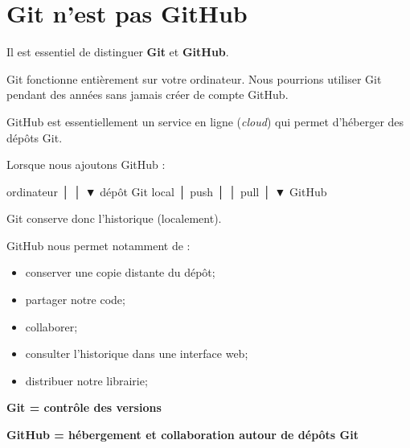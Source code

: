 \documentclass[
  letterpaper,
  DIV=11,
  numbers=noendperiod]{scrreprt}
\newenvironment{Shaded}{\begin{snugshade}}{\end{snugshade}}
\newcommand{\NormalTok}[1]{\textcolor[rgb]{0.00,0.23,0.31}{#1}}
\providecommand{\tightlist}{%
  \setlength{\itemsep}{0pt}\setlength{\parskip}{0pt}}\usepackage{longtable,booktabs,array}
\begin{document}
\section{Git n'est pas GitHub}\label{git-nest-pas-github-1}

Il est essentiel de distinguer \textbf{Git} et \textbf{GitHub}.

Git fonctionne entièrement sur votre ordinateur. Nous pourrions utiliser
Git pendant des années sans jamais créer de compte GitHub.

GitHub est essentiellement un service en ligne (\emph{cloud}) qui permet
d'héberger des dépôts Git.

Lorsque nous ajoutons GitHub :

\begin{Shaded}
\begin{Highlighting}[]
\NormalTok{       ordinateur}
\NormalTok{           │}
\NormalTok{           │}
\NormalTok{           ▼}
\NormalTok{      dépôt Git local}
\NormalTok{           │}
\NormalTok{      push │ │ pull}
\NormalTok{           │}
\NormalTok{           ▼}
\NormalTok{        GitHub}
\end{Highlighting}
\end{Shaded}

Git conserve donc l'historique (localement).

GitHub nous permet notamment de :

\begin{itemize}
\tightlist
\item
  conserver une copie distante du dépôt;
\item
  partager notre code;
\item
  collaborer;
\item
  consulter l'historique dans une interface web;
\item
  distribuer notre librairie;
\end{itemize}

\begin{tcolorbox}[enhanced jigsaw, arc=.35mm, title=\textcolor{quarto-callout-important-color}{\faExclamation}\hspace{0.5em}{Deux concepts différents}, colback=white, left=2mm, rightrule=.15mm, toptitle=1mm, opacityback=0, bottomtitle=1mm, breakable, colframe=quarto-callout-important-color-frame, coltitle=black, toprule=.15mm, titlerule=0mm, opacitybacktitle=0.6, bottomrule=.15mm, colbacktitle=quarto-callout-important-color!10!white, leftrule=.75mm]

\textbf{Git = contrôle des versions}

\textbf{GitHub = hébergement et collaboration autour de dépôts Git}

\end{tcolorbox}
\end{document}
